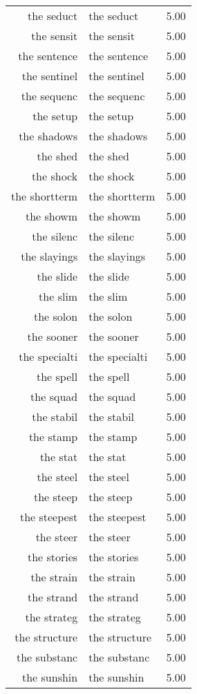\begin{table}[ht]
\begin{tabular}{rlr}
  the seduct & the seduct & 5.00 \\ 
  the sensit & the sensit & 5.00 \\ 
  the sentence & the sentence & 5.00 \\ 
  the sentinel & the sentinel & 5.00 \\ 
  the sequenc & the sequenc & 5.00 \\ 
  the setup & the setup & 5.00 \\ 
  the shadows & the shadows & 5.00 \\ 
  the shed & the shed & 5.00 \\ 
  the shock & the shock & 5.00 \\ 
  the shortterm & the shortterm & 5.00 \\ 
  the showm & the showm & 5.00 \\ 
  the silenc & the silenc & 5.00 \\ 
  the slayings & the slayings & 5.00 \\ 
  the slide & the slide & 5.00 \\ 
  the slim & the slim & 5.00 \\ 
  the solon & the solon & 5.00 \\ 
  the sooner & the sooner & 5.00 \\ 
  the specialti & the specialti & 5.00 \\ 
  the spell & the spell & 5.00 \\ 
  the squad & the squad & 5.00 \\ 
  the stabil & the stabil & 5.00 \\ 
  the stamp & the stamp & 5.00 \\ 
  the stat & the stat & 5.00 \\ 
  the steel & the steel & 5.00 \\ 
  the steep & the steep & 5.00 \\ 
  the steepest & the steepest & 5.00 \\ 
  the steer & the steer & 5.00 \\ 
  the stories & the stories & 5.00 \\ 
  the strain & the strain & 5.00 \\ 
  the strand & the strand & 5.00 \\ 
  the strateg & the strateg & 5.00 \\ 
  the structure & the structure & 5.00 \\ 
  the substanc & the substanc & 5.00 \\ 
  the sunshin & the sunshin & 5.00 \\ 

\end{tabular}
\end{table}
